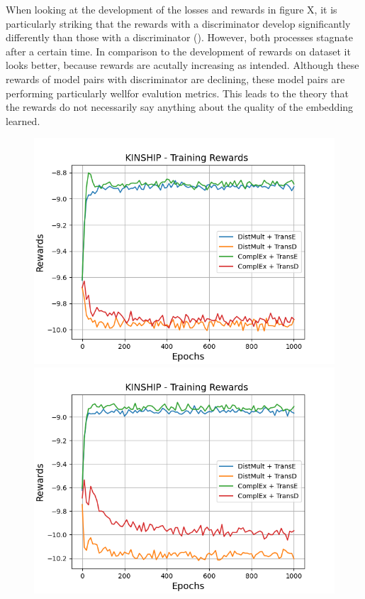 When looking at the development of the losses and rewards in figure X, it is particularly striking that the rewards with a \transe discriminator develop significantly differently than those with a \transd discriminator ().
However, both processes stagnate after a certain time.
In comparison to the development of rewards on \umls dataset it looks better, because rewards are acutally increasing as intended.
Although these rewards of model pairs with \transd discriminator are declining, these model pairs are performing particularly wellfor evalution metrics.
This leads to the theory that the rewards do not necessarily say anything about the quality of the embedding learned.
\begin{figure}[H]
    \centering
    \begin{minipage}{.5\textwidth}
      \centering
      \includegraphics[width=0.9\linewidth]{figures/results/gan_train/not_pretrained/uncertainty/max_distribution/entropy/kinship/1k_epochs/uncertainty_kinship_rew.png}
    \end{minipage}%
    \begin{minipage}{.5\textwidth}
      \centering
      \includegraphics[width=0.9\linewidth]{figures/results/gan_train/not_pretrained/uncertainty/max_distribution/least_confidence/kinship/uncertainty_kinship_rew.png}

\end{minipage}
\end{figure}
